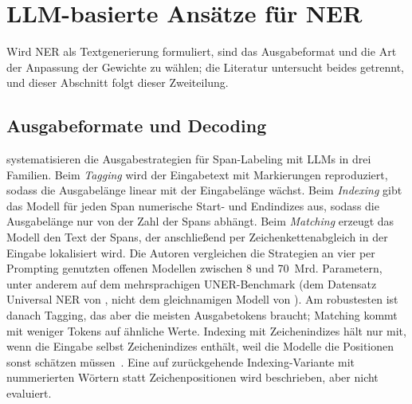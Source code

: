 \section{LLM-basierte Ansätze für NER}
\label{sec:llm_ner_related}

Wird NER als Textgenerierung formuliert, sind das Ausgabeformat und die
Art der Anpassung der Gewichte zu wählen; die Literatur untersucht beides
getrennt, und dieser Abschnitt folgt dieser Zweiteilung.

\subsection{Ausgabeformate und Decoding}
\label{sec:k3-ausgabeformate}

\textcite{semin2026spanLabeling} systematisieren die Ausgabestrategien
für Span-Labeling mit LLMs in drei Familien.
Beim \emph{Tagging} wird der Eingabetext mit Markierungen reproduziert,
sodass die Ausgabelänge linear mit der Eingabelänge wächst.
Beim \emph{Indexing} gibt das Modell für jeden Span numerische Start- und
Endindizes aus, sodass die Ausgabelänge nur von der Zahl der Spans
abhängt.
Beim \emph{Matching} erzeugt das Modell den Text der Spans, der
anschließend per Zeichenkettenabgleich in der Eingabe lokalisiert wird.
Die Autoren vergleichen die Strategien an vier per Prompting genutzten
offenen Modellen zwischen 8 und 70~Mrd. Parametern, unter anderem auf
dem mehrsprachigen UNER-Benchmark (dem Datensatz Universal NER von
\textcite{mayhew2024uner}, nicht dem gleichnamigen Modell von
\textcite{zhou2024universalner}). Am robustesten ist danach Tagging,
das aber die meisten Ausgabetokens braucht; Matching kommt mit weniger
Tokens auf ähnliche Werte. Indexing mit Zeichenindizes hält nur mit, wenn
die Eingabe selbst Zeichenindizes enthält, weil die Modelle die
Positionen sonst schätzen
müssen~\cite[Abschn.~3.4 und~6]{semin2026spanLabeling}.
Eine auf \textcite[Tab.~9]{ramponi2025fallacy} zurückgehende
Indexing-Variante mit nummerierten Wörtern statt Zeichenpositionen wird
beschrieben, aber nicht evaluiert.

